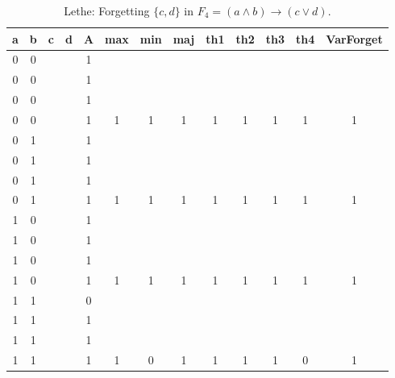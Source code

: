 \begin{table}[!tb]
    \centering
    \begin{tabular}{|c|c|c|c|c|c|c|c|c|c|c|c|c|}
        \hline
        \textbf{a} & \textbf{b} & \textbf{c} & \textbf{d} & \textbf{A} & \textbf{max} & \textbf{min} & \textbf{maj} & \textbf{th1} & \textbf{th2} & \textbf{th3} & \textbf{th4} & \textbf{VarForget} \\ \hline
        \rowcolor{gray!40} 0 & 0 &  &  & 1 &  &  &  &  &  &  &  &  \\ \hline
        \rowcolor{gray!40} 0 & 0 &  &  & 1 &  &  &  &  &  &  &  &  \\ \hline
        \rowcolor{gray!40} 0 & 0 &  &  & 1 &  &  &  &  &  &  &  &  \\ \hline
        \rowcolor{gray!40} 0 & 0 &  &  & 1 & 1 & 1 & 1 & 1 & 1 & 1 & 1 & 1 \\ \hline
        \rowcolor{blue!40} 0 & 1 &  &  & 1 &  &  &  &  &  &  &  &  \\ \hline
        \rowcolor{blue!40} 0 & 1 &  &  & 1 &  &  &  &  &  &  &  &  \\ \hline
        \rowcolor{blue!40} 0 & 1 &  &  & 1 &  &  &  &  &  &  &  &  \\ \hline
        \rowcolor{blue!40} 0 & 1 &  &  & 1 & 1 & 1 & 1 & 1 & 1 & 1 & 1 & 1 \\ \hline
        \rowcolor{red!40} 1 & 0 &  &  & 1 &  &  &  &  &  &  &  &  \\ \hline
        \rowcolor{red!40} 1 & 0 &  &  & 1 &  &  &  &  &  &  &  &  \\ \hline
        \rowcolor{red!40} 1 & 0 &  &  & 1 &  &  &  &  &  &  &  &  \\ \hline
        \rowcolor{red!40} 1 & 0 &  &  & 1 & 1 & 1 & 1 & 1 & 1 & 1 & 1 & 1 \\ \hline
        \rowcolor{green!40} 1 & 1 &  &  & 0 &  &  &  &  &  &  &  &  \\ \hline
        \rowcolor{green!40} 1 & 1 &  &  & 1 &  &  &  &  &  &  &  &  \\ \hline
        \rowcolor{green!40} 1 & 1 &  &  & 1 &  &  &  &  &  &  &  &  \\ \hline
        \rowcolor{green!40} 1 & 1 &  &  & 1 & 1 & 0 & 1 & 1 & 1 & 1 & 0 & 1 \\ \hline
    \end{tabular}
    \caption{Lethe: Forgetting $\{c, d\}$ in $F_{4} = (a \land b) \rightarrow (c \lor d)$.}
    \label{tab:lethe-F4-cd}
\end{table}
